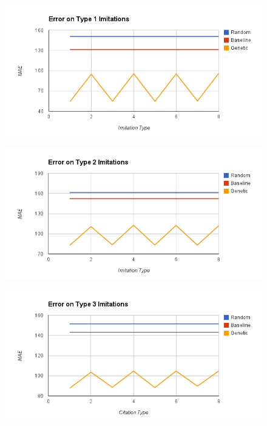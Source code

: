 \begin{figure}[center]
	\centering
	\includegraphics[width=16cm]{images/error_type_1_imitations.png}
	\caption{}
	\label{fig:c1}
\end{figure}
\begin{figure}[center]
	\centering
	\includegraphics[width=16cm]{images/error_type_2_imitations.png}
	\caption{}
	\label{fig:c2}
\end{figure}
\begin{figure}[center]
	\centering
	\includegraphics[width=16cm]{images/error_type_3_imitations.png}
	\caption{}
	\label{fig:c3}
\end{figure}
